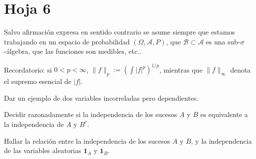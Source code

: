 

\newpage
\section{Hoja 6}

Salvo afirmaci\'on expresa en sentido
contrario se asume siempre que estamos trabajando en un espacio de probabilidad $(\Omega, \mathcal{A}, P)$,
que  $\mathcal{B}\subset \mathcal{A}$ es una sub-$\sigma$-\'algebra, que las funciones son medibles, etc..

Recordatorio: si $0 < p < \infty$, $\|f\|_p := \left(\int|f|^p\right)^{1/p}$, mientras que
$\|f\|_\infty$ denota el supremo esencial de $|f|$. 


\begin{problem}[1] Dar un ejemplo de dos variables incorreladas pero dependientes.

\solution

\begin{expla}

\end{expla}

\end{problem}


\begin{problem}[2] Decidir razonadamente si la independencia de los sucesos $A$ y $B$ es equivalente a la independencia de $A$ y $B^c$.
\solution

\begin{expla}

\end{expla}

\end{problem}


\begin{problem}[3] Hallar la relaci\'on entre la independencia de los sucesos $A$ y $B$, y la independencia de las variables aleatorias $\mathbf{1}_A$ y $\mathbf{1}_B$.
\solution

\begin{expla}

\end{expla}

\end{problem}

